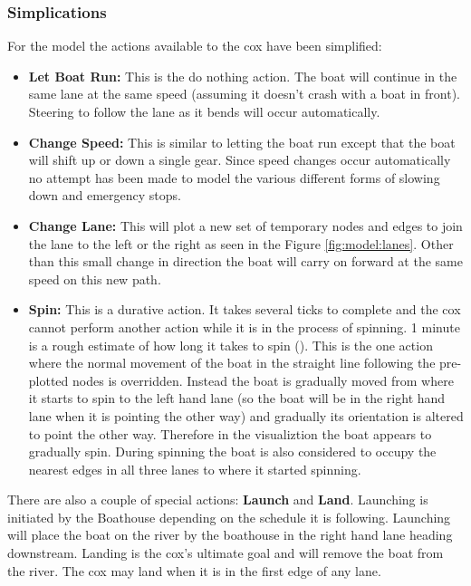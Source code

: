       \subsubsection{Simplications}
      For the model the actions available to the cox have been simplified:
      \begin{itemize}
        \item{\textbf{Let Boat Run:}} This is the do nothing action. The boat will continue in the same lane at the same speed (assuming it doesn't crash with a boat in front). Steering to follow the lane as it bends will occur automatically.
        \item{\textbf{Change Speed:}} This is similar to letting the boat run except that the boat will shift up or down a single gear. Since speed changes occur automatically no attempt has been made to model the various different forms of slowing down and emergency stops.
        \item{\textbf{Change Lane:}} This will plot a new set of temporary nodes and edges to join the lane to the left or the right as seen in the Figure \ref{fig:model:lanes}. Other than this small change in direction the boat will carry on forward at the same speed on this new path.
        \item{\textbf{Spin:}} This is a durative action. It takes several ticks to complete and the cox cannot perform another action while it is in the process of spinning. 1 minute is a rough estimate of how long it takes to spin (\cite{QCBC}). This is the one action where the normal movement of the boat in the straight line following the pre-plotted nodes  is overridden. Instead the boat is gradually moved from where it starts to spin to the left hand lane (so the boat will be in the right hand lane when it is pointing the other way) and gradually its orientation is altered to point the other way. Therefore in the visualiztion the boat appears to gradually spin. During spinning the boat is also considered to occupy the nearest edges in all three lanes to where it started spinning.
      \end{itemize}
      
      There are also a couple of special actions: \textbf{Launch} and \textbf{Land}. Launching is initiated by the Boathouse depending on the schedule it is following. Launching will place the boat on the river by the boathouse in the right hand lane heading downstream. Landing is the cox's ultimate goal and will remove the boat from the river. The cox may land when it is in the first edge of any lane.
      
